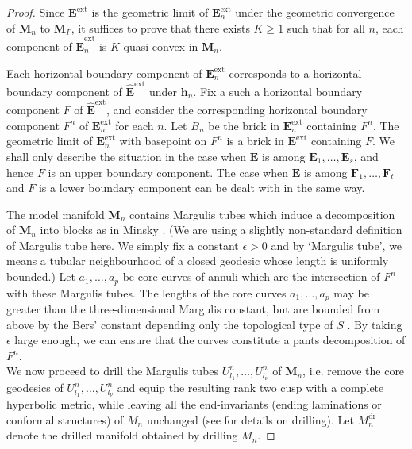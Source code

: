 \documentclass{amsart}
\theoremstyle{definition}
\newcommand\ep{\epsilon}
\begin{document}
\begin{proof}
Since $\mathbf E^{\mathrm{ext}}$ is the geometric limit of $\mathbf E^\mathrm{ext}_n$ under the geometric convergence of $\mathbf M_n$ to $\mathbf M_\Gamma$, it suffices to prove that there exists $K \geq 1$
such that for all $n$,  each component of $\widetilde{\mathbf E}_n^{\mathrm{ext}}$ 
is $K$-quasi-convex in $\widetilde{\mathbf M}_n$.

Each horizontal boundary component of $\mathbf E^\mathrm{ext}_n$ corresponds to a horizontal boundary component of $\widehat{\mathbf{E}}^\mathrm{ext}$ under $\mathbf h_n$.
Fix a such a horizontal boundary component $F$ of $\widehat{\mathbf E}^\mathrm{ext}$, and consider the corresponding horizontal boundary component $F^n$ of $\mathbf E_n^\mathrm{ext}$ for each $n$.
Let $B_n$ be the brick in $\mathbf E^\mathrm{ext}_n$ containing $F^n$.
The geometric limit of $\mathbf E^\mathrm{ext}_n$ with basepoint on $F^n$ is a brick in $\mathbf E^\mathrm{ext}$ containing $F$.
We shall only describe the situation in the case when $\mathbf E$ is among $\mathbf E_1, \dots , \mathbf E_s$, and hence $F$ is an upper boundary component.
The case when $\mathbf E$ is among $\mathbf F_1, \dots , \mathbf F_t$ and $F$ is a lower boundary component can be dealt with in the same way.

The model manifold $\mathbf M_n$ contains Margulis tubes which induce a decomposition of $\mathbf M_n$ into blocks as in Minsky \cite{minsky-elc1}.
(We are using a slightly non-standard definition of Margulis tube here. We simply fix a constant $\ep>0$ and by \lq Margulis tube', we
means a tubular neighbourhood of a closed geodesic whose length is uniformly bounded.)
Let $a_1, \dots , a_p$ be core curves of annuli which are the intersection of $F^n$ with these Margulis tubes. 
The lengths of the core curves $a_1,\dots, a_p$ may be greater than the three-dimensional Margulis constant, but are bounded from above by the Bers' constant depending only the topological type of $S$  \cite[p. 20]{minsky-elc1}. 
By taking $\ep$ large enough, we can ensure that the curves constitute a pants decomposition of $F^n$.\\


 We now proceed to drill the Margulis tubes  $U^n_{l_1}, \dots, U^n_{l_\nu}$ of $\mathbf M_n$, i.e.  remove the core geodesics of $U^n_{l_1}, \dots, U^n_{l_\nu}$ and equip the resulting rank two cusp with a complete hyperbolic metric, while leaving all the end-invariants 
(ending laminations or conformal structures) of $M_n$ unchanged (see \cite{BB} for details on drilling).
Let $M_n^\mathrm{dr} $ denote the drilled manifold obtained by drilling $M_n$.


\end{proof}
\end{document}
